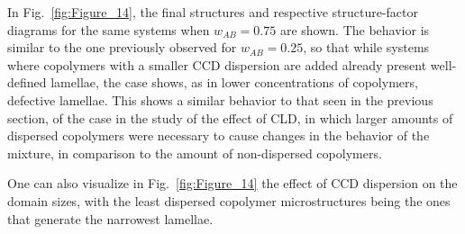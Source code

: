\documentclass[
journal=mamobx,
manuscript=article,
]{achemso}
\begin{document}
In Fig.~\ref{fig:Figure_14}, the final structures and respective structure-factor diagrams for the same systems when $w_{AB}=0.75$ are shown.
The behavior is similar to the one previously observed for $w_{AB}=0.25$, so that while systems where copolymers with a smaller CCD dispersion are added already present well-defined lamellae, the  case shows, as in lower concentrations of copolymers,  defective lamellae.
This shows a similar behavior to that seen in the previous section, of the case in the study of the effect of CLD, in which larger amounts of dispersed copolymers were necessary to cause changes in the behavior of the mixture, in comparison to the amount of non-dispersed copolymers.

One can also visualize in Fig.~\ref{fig:Figure_14} the effect of CCD dispersion on the domain sizes, with the least dispersed copolymer microstructures being the ones that generate the narrowest lamellae.
\end{document}
